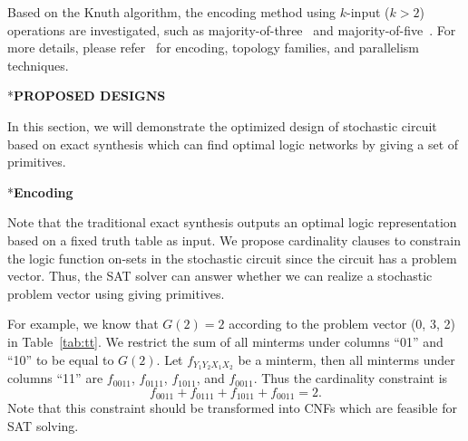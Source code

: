 \documentclass[conference,letterpaper]{IEEEtran}
\makeatletter
\renewcommand{\section}{\@startsection{section}{1}{0mm}
    {-\baselineskip}{0.001\baselineskip}{\bf\leftline}}
\renewcommand{\subsection}{\@startsection{subsection}{1}{0mm}
	{-\baselineskip}{0.001\baselineskip}{\bf\leftline}}
\makeatother
\begin{document}
Based on the Knuth algorithm, the encoding method using $k$-input ($k > 2$) operations are investigated, such as majority-of-three~\cite{Majority-of-Three} and majority-of-five~\cite{Majority-of-Five}. For more details, please refer~\cite{SAT-Based-Exact} 
 for encoding, topology families, and parallelism techniques.

\section*{\textbf{\large PROPOSED DESIGNS}}

In this section, we will demonstrate the optimized design of stochastic circuit based on exact synthesis which can find optimal logic networks by giving a set of primitives.
\subsection*{\textbf{Encoding }}




Note that the traditional exact synthesis outputs an optimal logic representation based on a fixed truth table as input.
We propose cardinality clauses to constrain the logic function on-sets in the stochastic circuit since the circuit has a problem vector. Thus, the SAT solver can answer whether we can realize a stochastic problem vector using giving primitives. 

For example, we know that $G(2) = 2$ according to the problem vector (0, 3, 2) in Table~\ref{tab:tt}. We restrict the sum of all minterms under columns ``01'' and ``10'' to be equal to $G(2)$. 
Let $f_{Y_1Y_2X_1X_2}$ be a minterm, then all minterms under columns ``11''
are $f_{0011}$, $f_{0111}$, $f_{1011}$, and $f_{0011}$.
Thus the cardinality constraint is \vspace{-0.5ex}
\begin{equation}
f_{0011} + f_{0111} + f_{1011} + f_{0011} = 2.
\end{equation}
Note that this constraint should be transformed into CNFs which are feasible for SAT solving.
\end{document}
